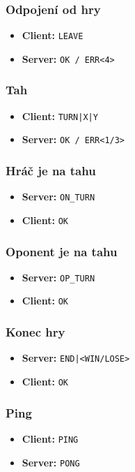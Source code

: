 \documentclass[11pt,a4paper]{article}
\begin{document}
\subsubsection*{Odpojení od hry}
\begin{itemize}
	\item \textbf{Client:} \texttt{LEAVE}
	\item \textbf{Server:} \texttt{OK / ERR<4>}
\end{itemize}

\subsubsection*{Tah}
\begin{itemize}
	\item \textbf{Client:} \texttt{TURN|X|Y}
	\item \textbf{Server:} \texttt{OK / ERR<1/3>}
\end{itemize}

\subsubsection*{Hráč je na tahu}
\begin{itemize}
	\item \textbf{Server:} \texttt{ON\_TURN}
	\item \textbf{Client:} \texttt{OK}
\end{itemize}

\subsubsection*{Oponent je na tahu}
\begin{itemize}
	\item \textbf{Server:} \texttt{OP\_TURN}
	\item \textbf{Client:} \texttt{OK}
\end{itemize}

\subsubsection*{Konec hry}
\begin{itemize}
	\item \textbf{Server:} \texttt{END|<WIN/LOSE>}
	\item \textbf{Client:} \texttt{OK}
\end{itemize}

\subsubsection*{Ping}
\begin{itemize}
	\item \textbf{Client:} \texttt{PING}
	\item \textbf{Server:} \texttt{PONG}
\end{itemize}
\end{document}
